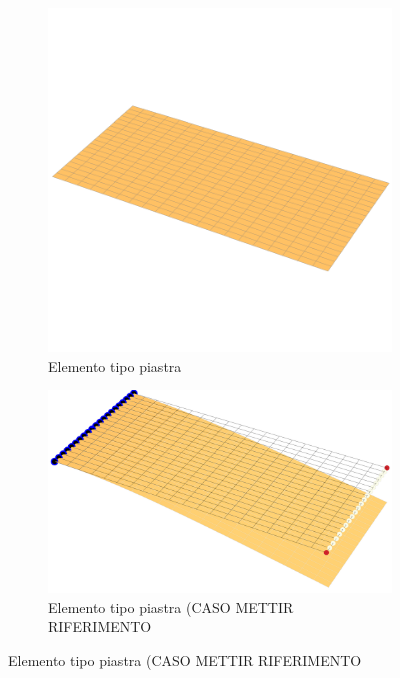 \documentclass[a4paper,num-refs]{oup-contemporary}
\begin{document}
\begin{figure}[bt!]
	\centering
	\begin{subfigure}[t]{0.24\textwidth}
		\centering

 \includegraphics[width=\textwidth]{plate_.pdf}
 				\caption{Elemento tipo piastra}
		\label{fig:y equals x}
	\end{subfigure}
	\hfill
	\begin{subfigure}[t]{0.24\textwidth}
		\centering
		\includegraphics[width=\textwidth]{plate_deformed.pdf}
		\caption{Elemento tipo piastra (CASO METTIR RIFERIMENTO}
		\label{fig:five over x}
	\end{subfigure}

\end{figure}
\end{document}
